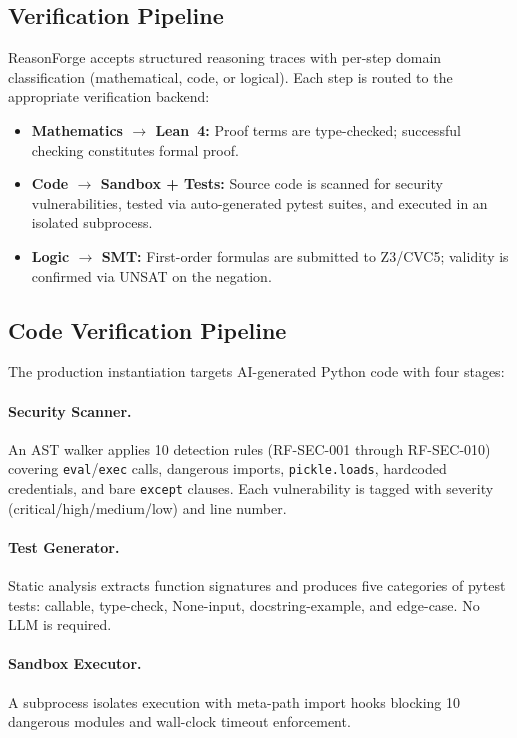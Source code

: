 \documentclass[10pt,a4paper,twocolumn]{article}
\begin{document}
\subsection{Verification Pipeline}

ReasonForge accepts structured reasoning traces with per-step domain
classification (mathematical, code, or logical).  Each step is routed to
the appropriate verification backend:

\begin{itemize}[nosep,leftmargin=*]
  \item \textbf{Mathematics $\rightarrow$ Lean~4:} Proof terms are
    type-checked; successful checking constitutes formal proof.
  \item \textbf{Code $\rightarrow$ Sandbox + Tests:} Source code is
    scanned for security vulnerabilities, tested via auto-generated
    pytest suites, and executed in an isolated subprocess.
  \item \textbf{Logic $\rightarrow$ SMT:} First-order formulas are
    submitted to Z3/CVC5; validity is confirmed via UNSAT on the
    negation.
\end{itemize}

\subsection{Code Verification Pipeline}

The production instantiation targets AI-generated Python code with four
stages:

\paragraph{Security Scanner.} An AST walker applies 10 detection rules
(RF-SEC-001 through RF-SEC-010) covering \texttt{eval}/\texttt{exec}
calls, dangerous imports, \texttt{pickle.loads}, hardcoded credentials,
and bare \texttt{except} clauses.  Each vulnerability is tagged with
severity (critical/high/medium/low) and line number.

\paragraph{Test Generator.} Static analysis extracts function signatures
and produces five categories of pytest tests: callable, type-check,
None-input, docstring-example, and edge-case.  No LLM is required.

\paragraph{Sandbox Executor.} A subprocess isolates execution with
meta-path import hooks blocking 10 dangerous modules and wall-clock
timeout enforcement.
\end{document}
